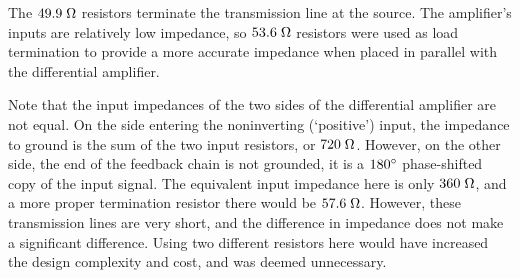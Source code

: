 The $49.9\;\mathrm{\Omega}$ resistors terminate the transmission line at the
source. The amplifier's inputs are relatively low impedance, so $53.6\;\mathrm{\Omega}$
resistors were used as load termination to provide a more accurate impedance when
placed in parallel with the differential amplifier.

Note that the input impedances of the two sides of the differential amplifier
are not equal. On the side entering the noninverting (`positive') input, the
impedance to ground is the sum of the two input resistors, or $720\;\mathrm{\Omega}$.
However, on the other side, the end of the feedback chain is not grounded, it is
a $180{}^\circ$ phase-shifted copy of the input signal. The equivalent input impedance
here is only $360\;\mathrm{\Omega}$, and a more proper termination resistor there
would be $57.6\;\mathrm{\Omega}$. However, these transmission lines are very short,
and the difference in impedance does not make a significant difference. Using
two different resistors here would have increased the design complexity and cost,
and was deemed unnecessary. 
